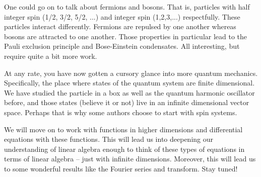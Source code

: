 \documentclass{article}
\begin{document}
    One could go on to talk about fermions and bosons. That is, particles with half integer spin (1/2, 3/2, 5/2, ...) and integer spin (1,2,3,...) respectfully. These particles interact differently. Fermions are repulsed by one another whereas bosons are attracted to one another. Those properties in particular lead to the Pauli exclusion principle and Bose-Einstein condensates.  All interesting, but require quite a bit more work.

    At any rate, you have now gotten a cursory glance into more quantum mechanics. Specifically, the place where states of the quantum system are finite dimensional. We have studied the particle in a box as well as the quantum harmonic oscillator before, and those states (believe it or not) live in an infinite dimensional vector space. Perhaps that is why some authors choose to start with spin systems.

    We will move on to work with functions in higher dimensions and differential equations with these functions. This will lead us into deepening our understanding of linear algebra enough to think of these types of equations in terms of linear algebra -- just with infinite dimensions. Moreover, this will lead us to some wonderful results like the Fourier series and transform. Stay tuned!
\end{document}

